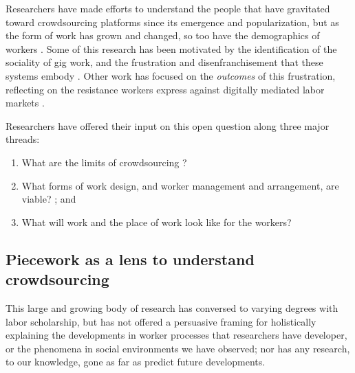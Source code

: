 \documentclass[trackingWork]{subfiles}
\begin{document}
Researchers have made efforts to understand the people
that have gravitated toward crowdsourcing platforms
since its emergence and popularization,
but as the form of work has grown and changed, so too have the demographics of workers
\cite{Ross,whoareNOTtheTurkers}.
Some of this research has been motivated by the identification of the sociality of gig work,
and the frustration and disenfranchisement that these systems embody
\cite{turkopticon,dynamo}.
Other work has focused on the \textit{outcomes} of this frustration,
reflecting on the resistance workers express against digitally mediated labor markets
\cite{uberAlgorithm}.

Researchers have offered their input on this open question along three major threads:
\begin{enumerate}
  \item What are the limits of crowdsourcing
        \cite{foundry,suzukiAtelier,KimStoria,yuanAlmost,YuEncouragingOutside,embracingErrorKrishna,
              Nebeling:2016:WCW:2858036.2858169,Hahn:2016:KAB:2858036.2858364}?
  \item What forms of work design, and worker management and arrangement, are viable?
        \cite{bernsteinSoylent,sensitiveTasks,LykourentzouPersonalityMatters,KucherbaevReLauncher,
              Law:2016:CKC:2858036.2858144,Cai:2016:CRI:2858036.2858237,
              Chang:2016:ACC:2858036.2858411,Newell:2016:OMA:2858036.2858490}; and%
  \item What will work and the place of work look like for the workers?
        \cite{turkopticon,storiesIraniSilberman,dynamo,crowdcollab,whyWouldAnyoneBrewer,
              takingAHITMcInnis}
\end{enumerate}


\subsection{Piecework as a lens to understand crowdsourcing}
This large and growing body of research has conversed
to varying degrees with labor scholarship,
but has not offered a persuasive framing for holistically explaining
the developments in worker processes that researchers have developer, or
the phenomena in social environments we have observed;
nor has any research, to our knowledge,
gone as far as predict future developments.
\end{document}
